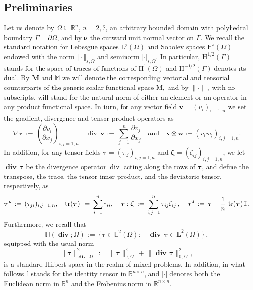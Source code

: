 \documentclass[11pt]{article}
\numberwithin{equation}{section}
\newcommand{\tr}{\operatorname*{tr}}
\newcommand{\bdiv}{\operatorname*{\mathbf{div}}}
\newcommand{\vdiv}{\operatorname*{div}}
\def\bw{{\boldsymbol{w}}}
\def\b{\boldsymbol}
\def\bnu{{\boldsymbol{\nu}}}
\def\bta{\boldsymbol{\tau}}
\newcommand{\RR}{\mathbb{R}}
\numberwithin{equation}{section}
\begin{document}
	\subsection{Preliminaries}
	Let us denote by $\Omega\subseteq \RR^n$, $n=2,3$, an arbitrary bounded domain with
	polyhedral boundary $\Gamma= \partial \Omega$,  and
	by $\bnu$ the outward unit normal vector on $\Gamma$.  We
	recall the standard notation for Lebesgue spaces $\mathrm L^p(\Omega)$
	and Sobolev spaces $\mathrm H^s(\Omega)$ endowed with the norm
	$\Vert\cdot\Vert_{s,\Omega}$ and seminorm $|\cdot|_{s,\Omega}$.  In
	particular, ${\mathrm H}^{1/2}(\Gamma)$ stands for the space of traces
	of functions of $\mathrm H^1(\Omega)$ and ${\mathrm H}^{-1/2}(\Gamma)$
	denotes its dual. By $\mathbf{M}$ and $\mathbb{M}$ we
	will denote the corresponding vectorial and tensorial counterparts of
	the generic scalar functional space $\mathrm M,$ and by $\| \cdot\|,$ with no subscripts, will stand 
	for the natural norm of either an element or an operator in any  product functional space. 
	In turn, for any vector field $\b v=(v_i)_{i=1,n}$ we set the gradient, divergence and tensor product operators as
	\[
	\nabla \b v \,:=\, \left(\frac{\partial v_i}{\partial x_j}\right)_{i,j=1,n} \quad
	\vdiv\,\b v \,:=\, \sum_{j=1}^n \frac{\partial v_j}{\partial x_j}\quad\mathrm{and}\quad \b v\otimes\bw:=(v_iw_j)_{i,j=1,n}.
	\]
	In addition, for any tensor fields $\bta=(\tau_{ij})_{i,j=1,n}$
	and $\boldsymbol{\zeta} = (\zeta_{ij})_{i,j=1,n}$, we let $\bdiv\,\bta$ be the divergence operator
	$\vdiv$ acting along the rows of $\bta$, and define the transpose, the trace,
	the tensor inner product, and the deviatoric tensor, respectively, as
	\[
	\bta^{\tt t} \,:=\, (\tau_{ji})_{i,j=1,n}, \quad
	\tr(\bta) \,:=\, \sum_{i=1}^n\tau_{ii}, \quad
	\bta:\boldsymbol{\zeta} \,:=\, \sum_{i,j=1}^n\tau_{ij}\zeta_{ij}\,, \quad
	\bta^{\tt d} \,:=\, \bta - \frac{1}{n}\,\tr(\bta)\,\mathbb I\,.
	\]
	Furthermore, we recall that
	\[
	\mathbb{H}(\bdiv;\Omega) \,:=\, \Big\{\bta\in \mathbb L^2(\Omega):  \quad \bdiv\,\bta\in
	\mathbf L^2(\Omega)\Big\}\,,
	\]
	equipped with the usual norm
	\[
	\|\bta\|^2_{\bdiv;\Omega} \,:=\, \|\bta\|^2_{0,\Omega}
	\,+\, \|\bdiv\,\bta\|^2_{0,\Omega}\,,
	\]
	is a standard Hilbert space in the realm of mixed problems. In addition, in what follows $\mathbb I$ stands for the 
	identity tensor in $\RR^{n\times n}$, and $|\cdot|$ denotes both the Euclidean norm in $\RR^n$ and the Frobenius norm in $\RR^{n\times n}$. 
\end{document}

